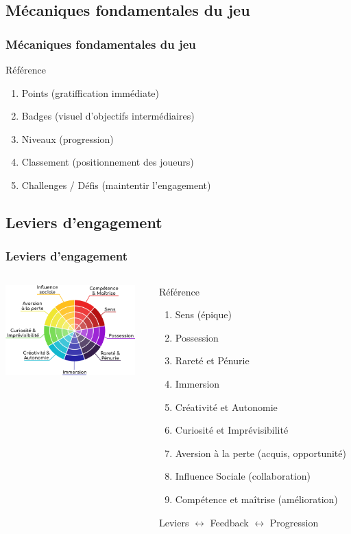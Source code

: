 \documentclass[slidetop,11pt]{beamer}
\begin{document}
\subsection{M{\'e}caniques fondamentales du jeu}
\begin{frame}
	\frametitle{M{\'e}caniques fondamentales du jeu} %
	R{\'e}f{\'e}rence~\cite{gamificationEntrepriseCommentCaMarche}
	\begin{enumerate}
		\item Points (gratiffication imm{\'e}diate)
		\item Badges (visuel d'objectifs interm{\'e}diaires)
		\item Niveaux (progression)
		\item Classement (positionnement des joueurs)
		\item Challenges / D{\'e}fis (maintentir l'engagement)
	\end{enumerate}
\end{frame}

\subsection{Leviers d'engagement}
\begin{frame}
	\frametitle{Leviers d'engagement}
	
	\begin{columns}[T]
	\begin{column}[T]{5cm}
		\includegraphics[width=5cm]{img/evaluation-heuristique.png}~\\
	\end{column}
	\begin{column}[T]{7cm}
		\footnotesize
		R{\'e}f{\'e}rence~\cite{PiliersGamification}
		\begin{enumerate}
			\item Sens ({\'e}pique)
			\item Possession
			\item Raret{\'e} et P{\'e}nurie
			\item Immersion
			\item Cr{\'e}ativit{\'e} et Autonomie
			\item Curiosit{\'e} et Impr{\'e}visibilit{\'e}
			\item Aversion {\`a} la perte (acquis, opportunit{\'e})
			\item Influence Sociale (collaboration)
			\item Comp{\'e}tence et ma{\^i}trise (am{\'e}lioration)
		\end{enumerate}
		Leviers $\leftrightarrow$ Feedback $\leftrightarrow$ Progression
	\end{column}
	\end{columns}
\end{frame}
\end{document}
